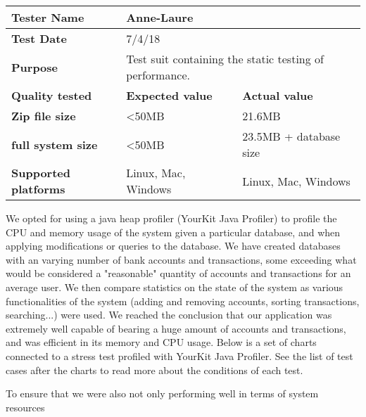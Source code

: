 \documentclass[12pt]{article}
\begin{document}
\begin{longtable}{|m{4cm}|m{6cm}|l|}
\hline
\cellcolor[HTML]{C0C0C0}\textbf{Tester Name} & \multicolumn{2}{p{13cm}|}{Anne-Laure}\\ \hline
\cellcolor[HTML]{C0C0C0}\textbf{Test Date} & \multicolumn{2}{p{13cm}|}{7/4/18}\\ \hline
\cellcolor[HTML]{C0C0C0}\textbf{Purpose} & \multicolumn{2}{p{13cm}|}{Test suit containing the static testing of performance.}\\ \hline
\cellcolor[HTML]{C0C0C0}\textbf{Quality tested} & \cellcolor[HTML]{C0C0C0}\textbf{Expected value} & \cellcolor[HTML]{C0C0C0}\textbf{Actual value}\\ \hline
\cellcolor[HTML]{C0C0C0}\textbf{Zip file size} & <50MB & 21.6MB \\ \hline
 \cellcolor[HTML]{C0C0C0}\textbf{full system size} & <50MB & 23.5MB + database size \\ \hline
 \cellcolor[HTML]{C0C0C0}\textbf{Supported platforms} & Linux, Mac, Windows & Linux, Mac, Windows\\ \hline
\end{longtable}

We opted for using a java heap profiler (YourKit Java Profiler) to profile the CPU and memory usage of the system given a particular database, and when applying modifications or queries to the database. We have created databases with an varying number of bank accounts and transactions, some exceeding what would be considered a "reasonable" quantity of accounts and transactions for an average user. We then compare statistics on the state of the system as various functionalities of the system (adding and removing accounts, sorting transactions, searching...) were used. We reached the conclusion that our application was extremely well capable of bearing a huge amount of accounts and transactions, and was efficient in its memory and CPU usage.
Below is a set of charts connected to a stress test profiled with YourKit Java Profiler. See the list of test cases after the charts to read more about the conditions of each test.

To ensure that we were also not only performing well in terms of system resources

\end{document}
